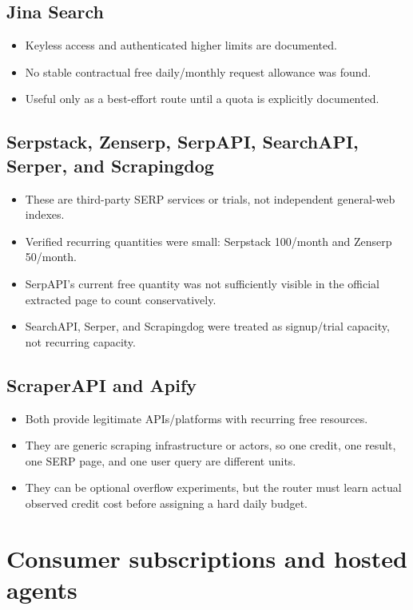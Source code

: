 \documentclass[11pt]{article}
\begin{document}
\subsection*{Jina Search}
\label{sec:orge0e6269}

\begin{itemize}
\item Keyless access and authenticated higher limits are documented.
\item No stable contractual free daily/monthly request allowance was found.
\item Useful only as a best-effort route until a quota is explicitly documented.
\end{itemize}
\subsection*{Serpstack, Zenserp, SerpAPI, SearchAPI, Serper, and Scrapingdog}
\label{sec:orgb30dd45}

\begin{itemize}
\item These are third-party SERP services or trials, not independent general-web
indexes.
\item Verified recurring quantities were small: Serpstack 100/month and Zenserp
50/month.
\item SerpAPI's current free quantity was not sufficiently visible in the official
extracted page to count conservatively.
\item SearchAPI, Serper, and Scrapingdog were treated as signup/trial capacity, not
recurring capacity.
\end{itemize}
\subsection*{ScraperAPI and Apify}
\label{sec:org575aa61}

\begin{itemize}
\item Both provide legitimate APIs/platforms with recurring free resources.
\item They are generic scraping infrastructure or actors, so one credit, one
result, one SERP page, and one user query are different units.
\item They can be optional overflow experiments, but the router must learn actual
observed credit cost before assigning a hard daily budget.
\end{itemize}
\section*{Consumer subscriptions and hosted agents}
\label{sec:org22e9aaa}
\end{document}
